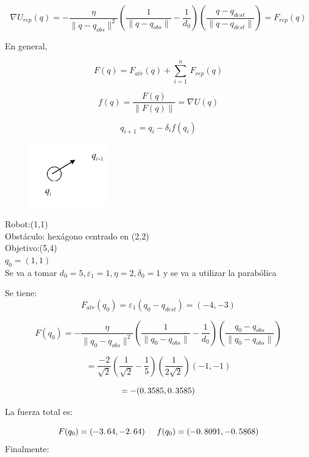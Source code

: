 $$
\nabla U_{rep}(q)=-\dfrac{\eta}{\rVert q-q_{obs}\lVert ^2} \left( \dfrac{1}{\lVert q-q_{obs}\rVert} - \dfrac{1}{d_0} \right)
\left( \dfrac{q-q_{dest}}{\lVert q-q_{dest}\rVert}\right)
 =F_{rep}(q)
$$

En general,

$$
F(q)=F_{atr}(q)+\sum_{i=1}^{n}\, F_{rep}(q)
$$

$$
f(q)=\frac{F(q)}{\|F(q)\|}=\nabla U(q)
$$

$$
q_{i+1}=q_i - \delta_i f(q_i)
$$

\begin{figure}[h!]
	\centering
	\includegraphics[width=0.3\textwidth]{images/img59.png}
	\label{figura59}
\end{figure}



\begin{ejemplo}
	Robot:(1,1) \\
	Obstáculo: hexágono centrado en (2,2) \\
	Objetivo:(5,4) \\
	$q_0=(1,1)$\\
	Se va a tomar $d_0=	5, \varepsilon_1=1, \eta=2,\delta_0=1$ y se va a utilizar la parabólica
\end{ejemplo}

Se tiene: 
$$
F_{atr}(q_0) = \varepsilon_1 (q_0-q_{dest}) = (-4,-3)
$$

$$
F(q_0) = - \dfrac{\eta}{\rVert q_0 - q_{obs} \lVert^2} \left(\dfrac{1}{\lVert q_0-q_{obs}\rVert} - \dfrac{1}{d_0} \right)
\left( \dfrac{q_0 - q_{obs}}{\lVert q_0 - q_{obs}\rVert}\right)
$$

$$
= \dfrac {-2}{\sqrt{2}} 
\left(\dfrac{1}{\sqrt{2}} - \dfrac{1}{5}\right) \left(\dfrac{1}{2\sqrt{2}} \right) (-1,-1)
$$


$$=-(0\ldotp3585,0\ldotp3585)$$

La fuerza total es: 



$$
F(q_0) =(-3\ldotp64,-2\ldotp64) \hspace{0.5cm} f(q_0)=(-0\ldotp8091,-0\ldotp 5868)
$$
Finalmente:


